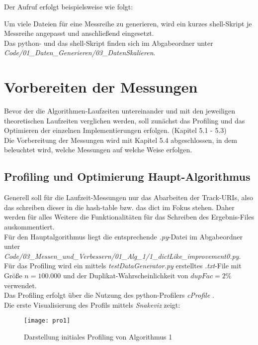 \documentclass[
10pt, %
a4paper, %
oneside, %
headinclude,footinclude, %
BCOR5mm, %
]{scrartcl}
\begin{document}
Der Aufruf erfolgt beispielsweise wie folgt:


Um viele Dateien für eine Messreihe zu generieren, wird ein kurzes shell-Skript je Messreihe angepasst und anschließend eingesetzt.\\

Das python- und das shell-Skript finden sich im Abgabeordner unter\\ \textit{Code/01\_Daten\_Generieren/03\_DatenSkalieren}.

\section{Vorbereiten der Messungen}
Bevor der die Algorithmen-Laufzeiten untereinander und mit den jeweiligen theoretischen Laufzeiten verglichen werden, soll zunächst das Profiling und das Optimieren der einzelnen Implementierungen erfolgen. (Kapitel 5.1 - 5.3)\\
Die Vorbereitung der Messungen wird mit Kapitel 5.4 abgeschlossen, in dem beleuchtet wird, welche Messungen auf welche Weise erfolgen.

\subsection{Profiling und Optimierung Haupt-Algorithmus}
Generell soll für die Laufzeit-Messungen nur das Abarbeiten der Track-URIs, also das schreiben dieser in die hash-table bzw. das dict im Fokus stehen. Daher werden für alles Weitere die Funktionalitäten für das Schreiben des Ergebnis-Files auskommentiert.\\
Für den Hauptalgorithmus liegt die entsprechende \textit{.py}-Datei im Abgabeordner unter \textit{Code/03\_Messen\_und\_Verbessern/01\_Alg\_1/1\_dictLike\_improvement0.py}.\\

Für das Profiling wird ein mittels \textit{testDataGenerator.py} erstelltes \textit{.txt}-File mit Größe \(n=100.000\) und der Duplikat-Wahrscheinlichkeit von \(dupFac = 2\%\) verwendet.\\
Das Profiling erfolgt über die Nutzung des python-Profilers \textit{cProfile} \cite{CPROF}.\\

Die erste Visualisierung des Profils mittels \textit{Snakeviz} zeigt:\\
\begin{figure}[h!]
	\centering 
	\texttt{[image: pro1]} 
	\caption[Darstellung initiales Profiling Alg. 1]{Darstellung initiales Profiling von Algorithmus 1}
\end{figure}\
\end{document}
